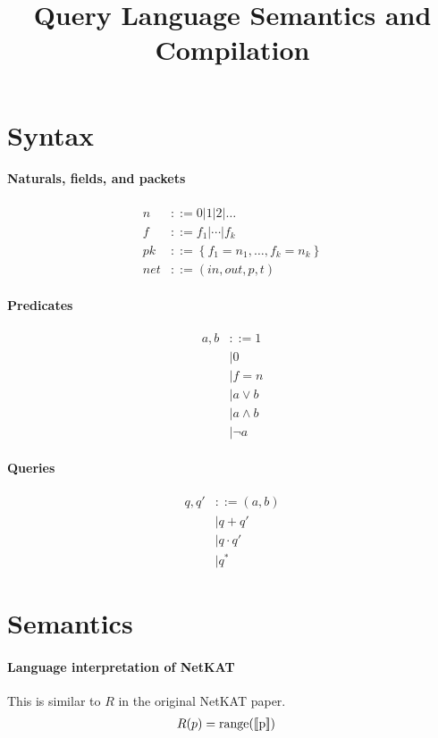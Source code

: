 \documentclass[12pt]{article}
\title{Query Language Semantics and Compilation}
\newcommand{\set}[1]{\left\{#1\right\}}
\newcommand{\denote}[1]{\text{$[\![ $#1$ ]\!]$}}
\begin{document}
\maketitle

\section{Syntax}
\paragraph{Naturals, fields, and packets}
\begin{align*}
  n  &::= 0 | 1 | 2 | \ldots \\
  f  &::= f_1 | \cdots | f_k \\
  pk &::= \set{f_1 = n_1, \ldots, f_k = n_k} \\
 net &::= (in, out, p, t)
\end{align*}

\paragraph{Predicates}
\begin{align*}
  a, b &::= 1 \\
       &| 0 \\
       &| f = n \\
       &| a \lor b \\
       &| a \land b \\
       &| \lnot a
\end{align*}

\paragraph{Queries}
\begin{align*}
  q, q' &::= (a, b) \\
        &| q + q'  \\
        &| q \cdot q' \\
        &| q^*
\end{align*}

\section{Semantics}
\paragraph{Language interpretation of NetKAT} This is similar to $R$ in the
original NetKAT paper.
\begin{align*}
  R(p) &= \text{range}(\denote{p})
\end{align*}
\end{document}
